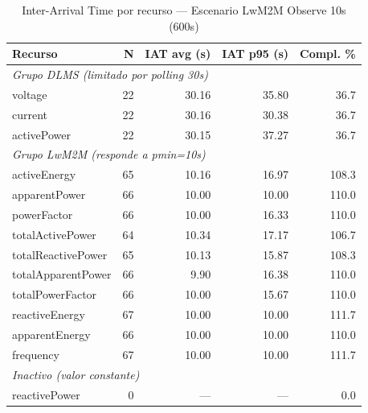 
\begin{table}[htbp]
\centering
\caption{Inter-Arrival Time por recurso — Escenario LwM2M Observe 10s (600s)}
\label{tab:iat-per-key-10s}
\begin{tabular}{lrrrr}
\toprule
\textbf{Recurso} & \textbf{N} & \textbf{IAT avg (s)} & \textbf{IAT p95 (s)} & \textbf{Compl. \%} \\
\midrule
\multicolumn{5}{l}{\textit{Grupo DLMS (limitado por polling 30s)}} \\
voltage & 22 & 30.16 & 35.80 & 36.7 \\
current & 22 & 30.16 & 30.38 & 36.7 \\
activePower & 22 & 30.15 & 37.27 & 36.7 \\
\midrule
\multicolumn{5}{l}{\textit{Grupo LwM2M (responde a pmin=10s)}} \\
activeEnergy & 65 & 10.16 & 16.97 & 108.3 \\
apparentPower & 66 & 10.00 & 10.00 & 110.0 \\
powerFactor & 66 & 10.00 & 16.33 & 110.0 \\
totalActivePower & 64 & 10.34 & 17.17 & 106.7 \\
totalReactivePower & 65 & 10.13 & 15.87 & 108.3 \\
totalApparentPower & 66 & 9.90 & 16.38 & 110.0 \\
totalPowerFactor & 66 & 10.00 & 15.67 & 110.0 \\
reactiveEnergy & 67 & 10.00 & 10.00 & 111.7 \\
apparentEnergy & 66 & 10.00 & 10.00 & 110.0 \\
frequency & 67 & 10.00 & 10.00 & 111.7 \\
\midrule
\multicolumn{5}{l}{\textit{Inactivo (valor constante)}} \\
reactivePower & 0 & --- & --- & 0.0 \\
\bottomrule
\end{tabular}
\end{table}
